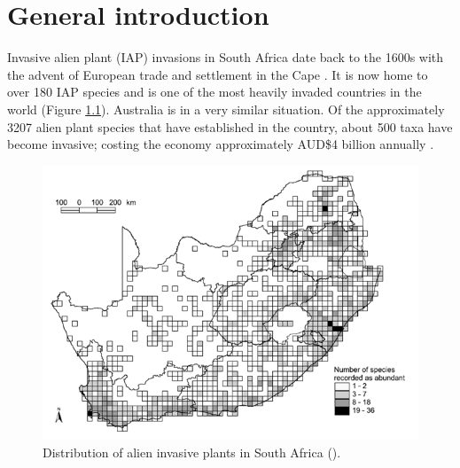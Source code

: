 \chapter{General introduction}

Invasive alien plant (IAP) invasions in South Africa date back to the 1600s with the advent of European trade and settlement in the Cape \citep{van2001economic, Zimmermann2004BiologicalWater, Moran2005, alston2006roles}. It is now home to over 180 IAP species and is one of the most heavily invaded countries in the world \citep{Henderson2001, Richardson2004} (Figure \ref{fig:SAmap}). Australia is in a very similar situation. Of the approximately 3207 alien plant species that have established in the country, about 500 taxa have become invasive; costing the economy approximately AUD\$4 billion annually \citep{australianWeedsStrategy2017}. 

\begin{figure}[H]
	\centering
	\includegraphics[scale = 0.8]{Images/SA_map}
	\caption{Distribution of alien invasive plants in South Africa (\cite{Henderson2001}).}
	\label{fig:SAmap}
\end{figure}

